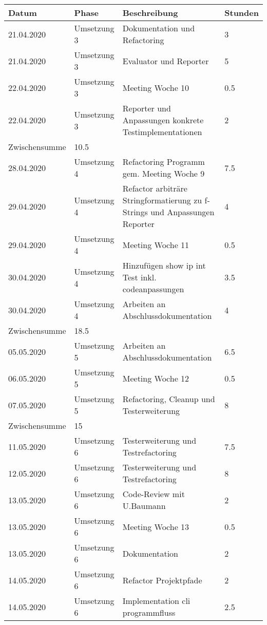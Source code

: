 \documentclass[
	ngerman,
	toc=listof, %
	toc=bibliography, %
	footnotes=multiple, %
	parskip=half, %
	numbers=noendperiod %
]{scrartcl}
\begin{document}
	\newpage

	\begin{tabularx}{\textwidth}{llXl}
		\toprule
		Datum & Phase & Beschreibung & Stunden \\
		\midrule
		21.04.2020 & Umsetzung 3 & Dokumentation und Refactoring & 3 \\
		21.04.2020 & Umsetzung 3 & Evaluator und Reporter & 5 \\
		22.04.2020 & Umsetzung 3 & Meeting Woche 10 & 0.5 \\
		22.04.2020 & Umsetzung 3 & Reporter und Anpassungen konkrete Testimplementationen & 2 \\
		\midrule
		Zwischensumme & 10.5 & & \\
		\midrule
		28.04.2020 & Umsetzung 4 & Refactoring Programm gem. Meeting Woche 9 & 7.5 \\
		29.04.2020 & Umsetzung 4 & Refactor arbiträre Stringformatierung zu f-Strings und Anpassungen Reporter & 4 \\
		29.04.2020 & Umsetzung 4 & Meeting Woche 11 & 0.5 \\
		30.04.2020 & Umsetzung 4 & Hinzufügen show ip int Test inkl. codeanpassungen & 3.5 \\
		30.04.2020 & Umsetzung 4 & Arbeiten an Abschlussdokumentation & 4 \\
		\midrule
		Zwischensumme & 18.5 & & \\
		\midrule
		05.05.2020 & Umsetzung 5 & Arbeiten an Abschlussdokumentation & 6.5 \\
		06.05.2020 & Umsetzung 5 & Meeting Woche 12 & 0.5 \\
		07.05.2020 & Umsetzung 5 & Refactoring, Cleanup und Testerweiterung & 8 \\
		\midrule
		Zwischensumme & 15 & & \\
		\midrule
		11.05.2020 & Umsetzung 6 & Testerweiterung und Testrefactoring & 7.5 \\
		12.05.2020 & Umsetzung 6 & Testerweiterung und Testrefactoring & 8 \\
		13.05.2020 & Umsetzung 6 & Code-Review mit U.Baumann & 2 \\
		13.05.2020 & Umsetzung 6 & Meeting Woche 13 & 0.5 \\
		13.05.2020 & Umsetzung 6 & Dokumentation & 2 \\
		14.05.2020 & Umsetzung 6 & Refactor Projektpfade & 2 \\
		14.05.2020 & Umsetzung 6 & Implementation cli programmfluss & 2.5\\
		\midrule

\end{tabularx}
\end{document}
